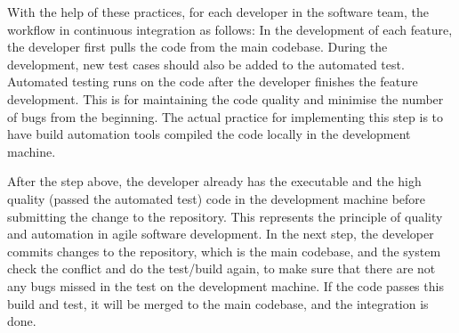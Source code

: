 With the help of these practices, for each developer in the software team, the workflow \cite{fowler2006continuous} in continuous integration as follows: In the development of each feature, the developer first pulls the code from the main codebase. During the development, new test cases should also be added to the automated test. Automated testing runs on the code after the developer finishes the feature development. This is for maintaining the code quality and minimise the number of bugs from the beginning. The actual practice for implementing this step is to have build automation tools compiled the code locally in the development machine. 
\par
After the step above, the developer already has the executable and the high quality (passed the automated test) code in the development machine before submitting the change to the repository. This represents the principle of quality and automation in agile software development. In the next step, the developer commits changes to the repository, which is the main codebase, and the system check the conflict and do the test/build again, to make sure that there are not any bugs missed in the test on the development machine.
If the code passes this build and test, it will be merged to the main codebase, and the integration is done.
